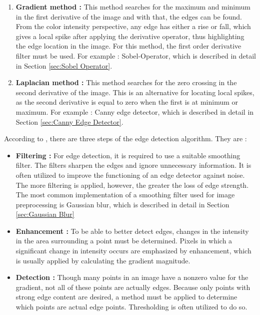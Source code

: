 \begin{enumerate}

\item \textbf{Gradient method : } This method searches for the maximum and minimum in the first derivative of the image and with that, the edges can be found. From the color intensity perspective, any edge has either a rise or fall, which gives a local spike after applying the derivative operator, thus highlighting the edge location in the image. For this method, the first order derivative filter must be used. For example : Sobel-Operator, which is described in detail in Section \ref{sec:Sobel Operator}.
 
\item \textbf{Laplacian method : } This method searches for the zero crossing in the second derivative of the image. This is an alternative for locating local spikes, as the second derivative is equal to zero when the first is at minimum or maximum. For example : Canny edge detector, which is described in detail in Section \ref{sec:Canny Edge Detector}. 
  
\end{enumerate}
 
According to \cite{Machine_Vision}, there are three steps of the edge detection algorithm. They are :

\begin{itemize}

\item \textbf{Filtering : } For edge detection, it is required to use a suitable smoothing filter. The filters sharpen the edges and ignore unnecessary information. It is often utilized to improve the functioning of an edge detector against noise. The more filtering is applied, however, the greater the loss of edge strength. The most common implementation of a smoothing filter used for image preprocessing is Gaussian blur, which is described in detail in Section \ref{sec:Gaussian Blur}   
 
\item \textbf{Enhancement : } To be able to better detect edges, changes in the intensity in the area surrounding a point must be determined. Pixels in which a significant change in intensity occurs are emphasized by enhancement, which is usually applied by calculating the gradient magnitude.
  
\item \textbf{Detection : } Though many points in an image have a nonzero value for the gradient, not all of these points are actually edges. Because only points with strong edge content are desired, a method must be applied to determine which points are actual edge points. Thresholding is often utilized to do so.
 
\end{itemize}

